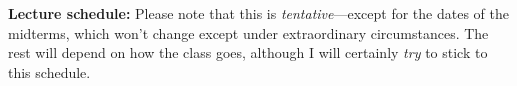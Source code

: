 \documentclass[12pt]{article}
\begin{document}
\vfill
\textbf{Lecture schedule:} 
Please note that this is \textit{tentative}---except for the dates of the midterms, which won't change except under extraordinary circumstances. The rest will depend on how the class goes, although I will certainly \textit{try} to stick to this schedule.
\vfill\mbox{}\newpage


\mbox{}\vspace{-2\baselineskip}\mbox{}\\
\begingroup
\normalsize
\renewcommand{\RSpercentTolerance}{0}

\setlength{\LTleft}{0.25in}
\setlength{\LTright}{\fill}
\end{document}
